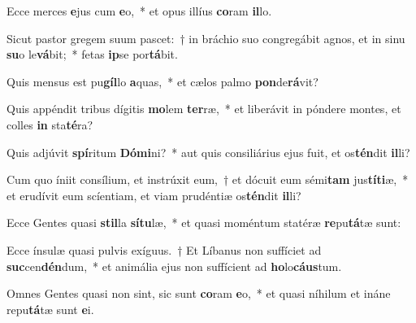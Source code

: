 \item Ecce merces \textbf{e}jus cum \textbf{e}o,~* et opus illíus \textbf{co}ram \textbf{il}lo.
\item Sicut pastor gregem suum pascet:~† in bráchio suo congregábit agnos, et in sinu \textbf{su}o le\textbf{vá}bit;~* fetas \textbf{ip}se por\textbf{tá}bit.
\item Quis mensus est pu\textbf{gíl}lo \textbf{a}quas,~* et cælos palmo \textbf{pon}de\textbf{rá}vit?
\item Quis appéndit tribus dígitis \textbf{mo}lem \textbf{ter}ræ,~* et liberávit in póndere montes, et colles \textbf{in} sta\textbf{té}ra?
\item Quis adjúvit \textbf{spí}ritum \textbf{Dó}\textbf{mi}ni?~* aut quis consiliárius ejus fuit, et os\textbf{tén}dit \textbf{il}li?
\item Cum quo íniit consílium, et instrúxit eum,~† et dócuit eum sémi\textbf{tam} jus\textbf{tí}\textbf{ti}æ,~* et erudívit eum scíentiam, et viam prudéntiæ os\textbf{tén}dit \textbf{il}li?
\item Ecce Gentes quasi \textbf{stil}la \textbf{sí}\textbf{tu}læ,~* et quasi moméntum statéræ \textbf{re}pu\textbf{tá}tæ sunt:
\item Ecce ínsulæ quasi pulvis exíguus.~† Et Líbanus non suffíciet ad \textbf{suc}cen\textbf{dén}dum,~* et animália ejus non suffícient ad \textbf{ho}lo\textbf{cáus}tum.
\item Omnes Gentes quasi non sint, sic sunt \textbf{co}ram \textbf{e}o,~* et quasi níhilum et ináne repu\textbf{tá}tæ sunt \textbf{e}i.
